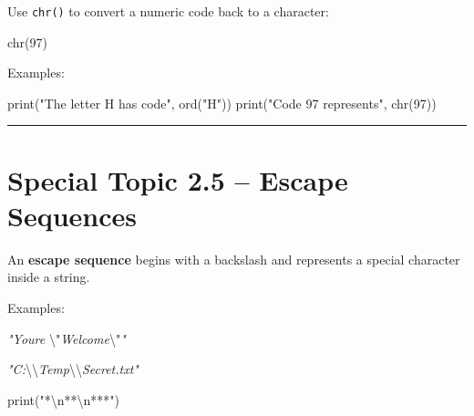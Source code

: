 \documentclass[
]{article}
\newenvironment{Shaded}{\begin{snugshade}}{\end{snugshade}}
\newcommand{\BuiltInTok}[1]{#1}
\newcommand{\CharTok}[1]{\textcolor[rgb]{0.31,0.60,0.02}{#1}}
\newcommand{\CommentTok}[1]{\textcolor[rgb]{0.56,0.35,0.01}{\textit{#1}}}
\newcommand{\DecValTok}[1]{\textcolor[rgb]{0.00,0.00,0.81}{#1}}
\newcommand{\NormalTok}[1]{#1}
\newcommand{\StringTok}[1]{\textcolor[rgb]{0.31,0.60,0.02}{#1}}
\begin{document}
Use \texttt{chr()} to convert a numeric code back to a character:

\begin{Shaded}
\begin{Highlighting}[]
\BuiltInTok{chr}\NormalTok{(}\DecValTok{97}\NormalTok{)}
\end{Highlighting}
\end{Shaded}

Examples:

\begin{Shaded}
\begin{Highlighting}[]
\BuiltInTok{print}\NormalTok{(}\StringTok{"The letter H has code"}\NormalTok{, }\BuiltInTok{ord}\NormalTok{(}\StringTok{"H"}\NormalTok{))}
\BuiltInTok{print}\NormalTok{(}\StringTok{"Code 97 represents"}\NormalTok{, }\BuiltInTok{chr}\NormalTok{(}\DecValTok{97}\NormalTok{))}
\end{Highlighting}
\end{Shaded}

\begin{center}\rule{0.5\linewidth}{0.5pt}\end{center}

\section{Special Topic 2.5 -- Escape
Sequences}\label{special-topic-2.5-escape-sequences}

An \textbf{escape sequence} begins with a backslash and represents a
special character inside a string.

Examples:

\begin{Shaded}
\begin{Highlighting}[]
\CommentTok{"You\textquotesingle{}re }\CharTok{\textbackslash{}"}\CommentTok{Welcome}\CharTok{\textbackslash{}"}\CommentTok{"}
\end{Highlighting}
\end{Shaded}

\begin{Shaded}
\begin{Highlighting}[]
\CommentTok{"C:}\CharTok{\textbackslash{}\textbackslash{}}\CommentTok{Temp}\CharTok{\textbackslash{}\textbackslash{}}\CommentTok{Secret.txt"}
\end{Highlighting}
\end{Shaded}

\begin{Shaded}
\begin{Highlighting}[]
\BuiltInTok{print}\NormalTok{(}\StringTok{"*}\CharTok{\textbackslash{}n}\StringTok{**}\CharTok{\textbackslash{}n}\StringTok{***"}\NormalTok{)}
\end{Highlighting}
\end{Shaded}
\end{document}
